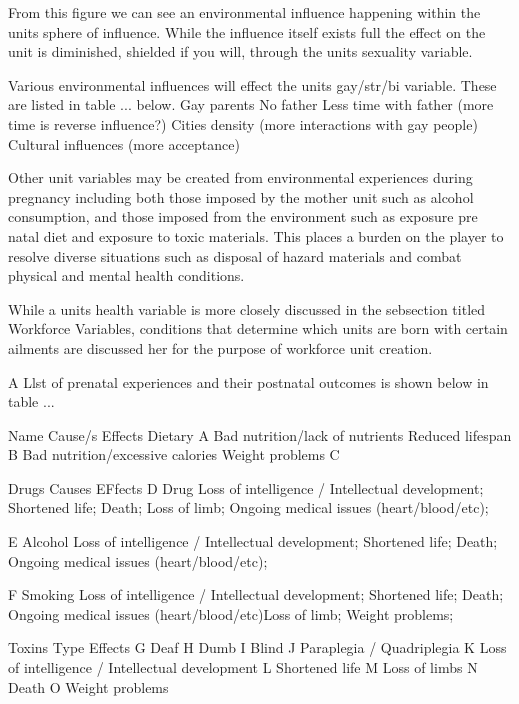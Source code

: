 From this figure we can see an environmental influence happening within the units sphere of influence. While the influence itself exists full the effect on the unit is diminished, shielded if you will, through the units sexuality variable. 

Various environmental influences will effect the units gay/str/bi variable. These are listed in table ... below.
Gay parents
No father
Less time with father (more time is reverse influence?)
Cities density (more interactions with gay people)
Cultural influences (more acceptance)




Other unit variables may be created from environmental experiences during pregnancy including both those imposed by the mother unit such as alcohol consumption, and those imposed from the environment such as exposure pre natal diet and exposure to toxic materials. This places a burden on the player to resolve diverse situations such as disposal of hazard materials and combat physical and mental health conditions.

While a units health variable is more closely discussed in the sebsection titled Workforce Variables, conditions that determine which units are born with certain ailments are discussed her for the purpose of workforce unit creation.

A Llst of prenatal experiences and their postnatal outcomes is shown below in table ...



 Name  		Cause/s					Effects				
Dietary							
  A		Bad nutrition/lack of nutrients		Reduced lifespan			
  B		Bad nutrition/excessive calories	Weight problems
  C							
							
Drugs		Causes					EFfects	
  D		Drug					Loss of intelligence / Intellectual development; Shortened life; Death; Loss of limb; Ongoing 								medical issues (heart/blood/etc);
  
  E		Alcohol					Loss of intelligence / Intellectual development; Shortened life; Death; Ongoing medical issues 								(heart/blood/etc);
  
  F		Smoking					Loss of intelligence / Intellectual development; Shortened life; Death; Ongoing medical issues 								(heart/blood/etc)Loss of limb; Weight problems;
							
Toxins		Type					Effects	
  G							Deaf	
  H							Dumb	
  I							Blind
  J							Paraplegia / Quadriplegia
  K							Loss of intelligence / Intellectual development
  L							Shortened life
  M							Loss of limbs
  N							Death
  O							Weight problems

